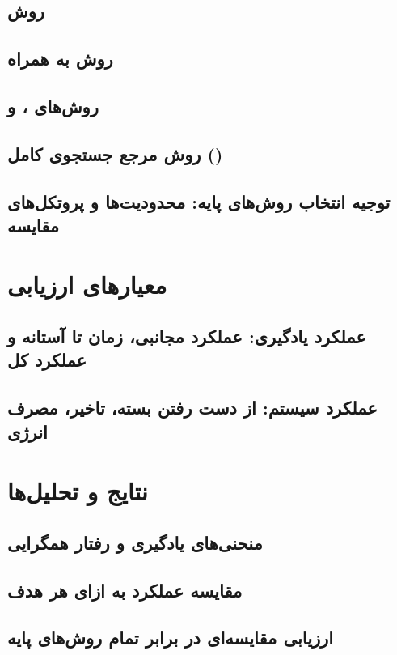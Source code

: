 \documentclass[12pt,a4paper]{report} %
\begin{document}
\subsection{روش }
\subsection{روش  به همراه }
\subsection{روش‌های ،  و }
\subsection{روش مرجع جستجوی کامل ()}
\subsection{توجیه انتخاب روش‌های پایه: محدودیت‌ها و پروتکل‌های مقایسه}

\bigskip %

\section{معیارهای ارزیابی}
\subsection{عملکرد یادگیری: عملکرد مجانبی، زمان تا آستانه و عملکرد کل}
\subsection{عملکرد سیستم: از دست رفتن بسته، تاخیر، مصرف انرژی}

\bigskip

\section{نتایج و تحلیل‌ها}
\subsection{منحنی‌های یادگیری و رفتار همگرایی}
\subsection{مقایسه عملکرد به ازای هر هدف}
\subsection{ارزیابی مقایسه‌ای در برابر تمام روش‌های پایه}
\end{document}
